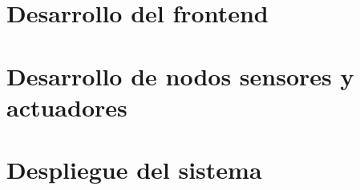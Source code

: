 \section{Desarrollo del frontend}


\section{Desarrollo de nodos sensores y actuadores}


\section{Despliegue del sistema}

